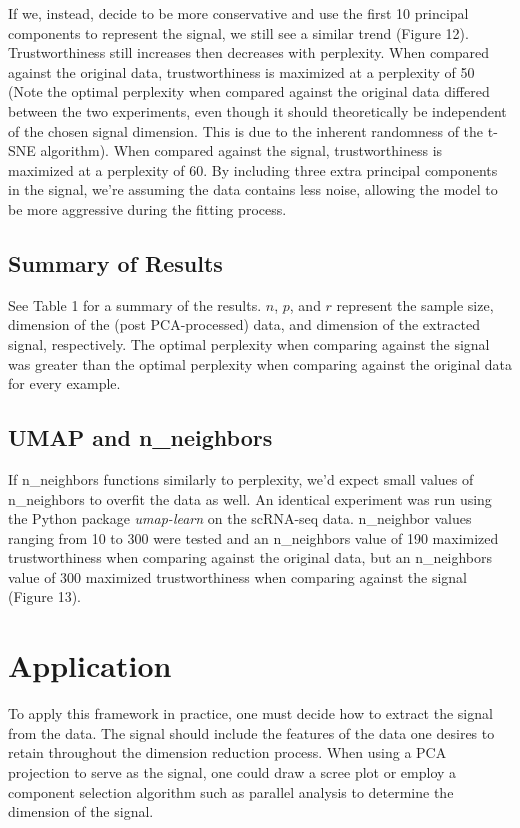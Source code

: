 \documentclass{article}
\begin{document}
If we, instead, decide to be more conservative and use the first 10 principal components to represent the signal, we still see a similar trend (Figure 12). Trustworthiness still increases then decreases with perplexity. When compared against the original data, trustworthiness is maximized at a perplexity of 50 (Note the optimal perplexity when compared against the original data differed between the two experiments, even though it should theoretically be independent of the chosen signal dimension. This is due to the inherent randomness of the t-SNE algorithm). When compared against the signal, trustworthiness is maximized at a perplexity of 60. By including three extra principal components in the signal, we're assuming the data contains less noise, allowing the model to be more aggressive during the fitting process.

\subsection{Summary of Results}
See Table 1 for a summary of the results. $n$, $p$, and $r$ represent the sample size, dimension of the (post PCA-processed) data, and dimension of the extracted signal, respectively. The optimal perplexity when comparing against the signal was greater than the optimal perplexity when comparing against the original data for every example.

\subsection{UMAP and n\_neighbors}
If n\_neighbors functions similarly to perplexity, we'd expect small values of n\_neighbors to overfit the data as well. An identical experiment was run using the Python package \textit{umap-learn} \cite{umap} on the scRNA-seq data. n\_neighbor values ranging from 10 to 300 were tested and an n\_neighbors value of 190 maximized trustworthiness when comparing against the original data, but an n\_neighbors value of 300 maximized trustworthiness when comparing against the signal (Figure 13).

\section{Application}
To apply this framework in practice, one must decide how to extract the signal from the data. The signal should include the features of the data one desires to retain throughout the dimension reduction process. When using a PCA projection to serve as the signal, one could draw a scree plot or employ a component selection algorithm such as parallel analysis \cite{parallel analysis} to determine the dimension of the signal.
\end{document}
